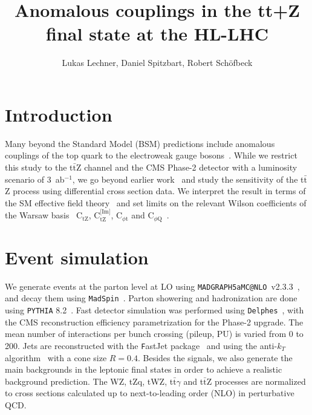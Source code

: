 \documentclass[letterpaper,11pt]{article}
\title{Anomalous couplings in the tt+Z final state at the HL-LHC}
\author{Lukas Lechner, Daniel Spitzbart, Robert Sch\"ofbeck}
\date{}
\makeatletter
\def\ttZ{t$\bar{\text{t}}$Z\xspace}
\def\ttG{t$\bar{\text{t}}\gamma$\xspace}
\def\WZ{WZ\xspace}
\def\tZq{tZq\xspace}
\def\tWZ{tWZ\xspace}
\def\ctZ{C$_\text{tZ}$\xspace}
\def\ctZI{C$_\text{tZ}^\text{[Im]}$\xspace}
\def\cpt{C$_{\phi \text{t}}$\xspace}
\def\cpQM{C$_{\phi \text{Q}}$\xspace}
\def\delphes{\texttt{Delphes}\xspace}
\def\MGvATNLO{\texttt{MADGRAPH5aMC@NLO}\xspace}
\def\PYTHIA{\texttt{PYTHIA}\xspace}
\def\MadSpin{\texttt{MadSpin}\xspace}
\makeatother
\begin{document}
\maketitle

\section{Introduction}\label{sec:introduction}

Many beyond the Standard Model (BSM) predictions include anomalous couplings of the top quark to the electroweak gauge bosons~\cite{Hollik:1998vz,Agashe:2006wa,Kagan:2009bn,Ibrahim:2010hv,Ibrahim:2011im,Grojean:2013qca,Richard:2013pwa}.
While we restrict this study to the \ttZ channel and the CMS Phase-2 detector with a luminosity scenario of 3~ab${}^{-1}$, we go beyond earlier work~\cite{Rontsch:2015una} and study the sensitivity of the \ttZ process using differential cross section data.
We interpret the result in terms of the SM effective field theory~\cite{AguilarSaavedra:2018nen} and set limits on the relevant Wilson coefficients of the Warsaw basis~\cite{Grzadkowski:2010es} \ctZ, \ctZI, \cpt and \cpQM~\cite{Brehmer:2016nyr, Brehmer:2017fyp}.

\section{Event simulation}
\label{sec:eventsimulation}
We generate events at the parton level at LO using \MGvATNLO~v2.3.3~\cite{Alwall:2014hca}, and decay them using \MadSpin~\cite{Artoisenet:2012st, Frixione:2007zp}.
Parton showering and hadronization are done using \PYTHIA 8.2~\cite{Sjostrand:2007gs,Sjostrand:2014zea}.
Fast detector simulation was performed using \delphes~\cite{deFavereau:2013fsa}, with the CMS reconstruction efficiency parametrization for the Phase-2 upgrade.
The mean number of interactions per bunch crossing (pileup, PU) is varied from 0 to 200.
Jets are reconstructed with the {\texttt FastJet} package~\cite{Cacciari:2011ma} and using the anti-$k_T$ algorithm~\cite{Cacciari:2008gp} with a cone size $R=0.4$.
Besides the signals, we also generate the main backgrounds in the leptonic final states in order to achieve a realistic background prediction.
The \WZ, \tZq, \tWZ, \ttG and \ttZ processes are normalized to cross sections calculated up to next-to-leading order (NLO) in perturbative QCD.
\end{document}
